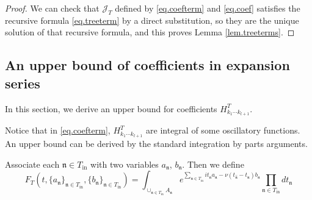 \begin{proof}
We can check that $\mathcal{J}_T$ defined by \eqref{eq.coefterm} and \eqref{eq.coef} satisfies the recursive formula \eqref{eq.treeterm} by a direct substitution, so they are the unique solution of that recursive formula, and this proves Lemma \ref{lem.treeterms}.
\end{proof}



\subsection{An upper bound of coefficients in expansion series}\label{sec.uppcoef} In this section, we derive an upper bound for coefficients $H^T_{k_1\cdots k_{l+1}}$.

Notice that in \eqref{eq.coefterm}, $H^T_{k_1\cdots k_{l+1}}$ are integral of some oscillatory functions. An upper bound can be derived by the standard integration by parts arguments.

Associate each $\mathfrak{n}\in T_{\text{in}}$ with two variables $a_{\mathfrak{n}}$, $b_{\mathfrak{n}}$. Then we define
\begin{equation}\label{eq.defF_T}
F_{T}(t,\{a_{\mathfrak{n}}\}_{\mathfrak{n}\in T_{\text{in}}},\{b_{\mathfrak{n}}\}_{\mathfrak{n}\in T_{\text{in}}})=\int_{\cup_{\mathfrak{n}\in T_{\text{in}}} A_{\mathfrak{n}}} e^{\sum_{\mathfrak{n}\in T_{\text{in}}} it_{\mathfrak{n}} a_{\mathfrak{n}} - \nu(t_{\widehat{\mathfrak{n}}}-t_{\mathfrak{n}})b_{\mathfrak{n}}} \prod_{\mathfrak{n}\in T_{\text{in}}} dt_{\mathfrak{n}} 
\end{equation}

